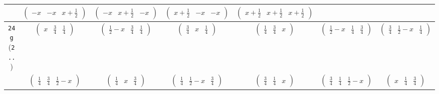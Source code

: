\documentclass[fleqn,9pt,landscape]{jsarticle}
\begin{document}
\begin{center}
\begin{longtable}{ccccccc}
& $ \begin{pmatrix} - x & - x & x + \frac{1}{2} \end{pmatrix} $ & $ \begin{pmatrix} - x & x + \frac{1}{2} & - x \end{pmatrix} $ & $ \begin{pmatrix} x + \frac{1}{2} & - x & - x \end{pmatrix} $ & $ \begin{pmatrix} x + \frac{1}{2} & x + \frac{1}{2} & x + \frac{1}{2} \end{pmatrix} $ & $  $ & $  $ \\ \hline
{\tt 24g} ({\tt 2..}) & $ \begin{pmatrix} x & \frac{3}{4} & \frac{1}{4} \end{pmatrix} $ & $ \begin{pmatrix} \frac{1}{2} - x & \frac{3}{4} & \frac{1}{4} \end{pmatrix} $ & $ \begin{pmatrix} \frac{3}{4} & x & \frac{1}{4} \end{pmatrix} $ & $ \begin{pmatrix} \frac{1}{4} & \frac{3}{4} & x \end{pmatrix} $ & $ \begin{pmatrix} \frac{1}{2} - x & \frac{1}{4} & \frac{3}{4} \end{pmatrix} $ & $ \begin{pmatrix} \frac{3}{4} & \frac{1}{2} - x & \frac{1}{4} \end{pmatrix} $ \\
& $ \begin{pmatrix} \frac{1}{4} & \frac{3}{4} & \frac{1}{2} - x \end{pmatrix} $ & $ \begin{pmatrix} \frac{1}{4} & x & \frac{3}{4} \end{pmatrix} $ & $ \begin{pmatrix} \frac{1}{4} & \frac{1}{2} - x & \frac{3}{4} \end{pmatrix} $ & $ \begin{pmatrix} \frac{3}{4} & \frac{1}{4} & x \end{pmatrix} $ & $ \begin{pmatrix} \frac{3}{4} & \frac{1}{4} & \frac{1}{2} - x \end{pmatrix} $ & $ \begin{pmatrix} x & \frac{1}{4} & \frac{3}{4} \end{pmatrix} $ \\

\end{longtable}
\end{center}
\end{document}
